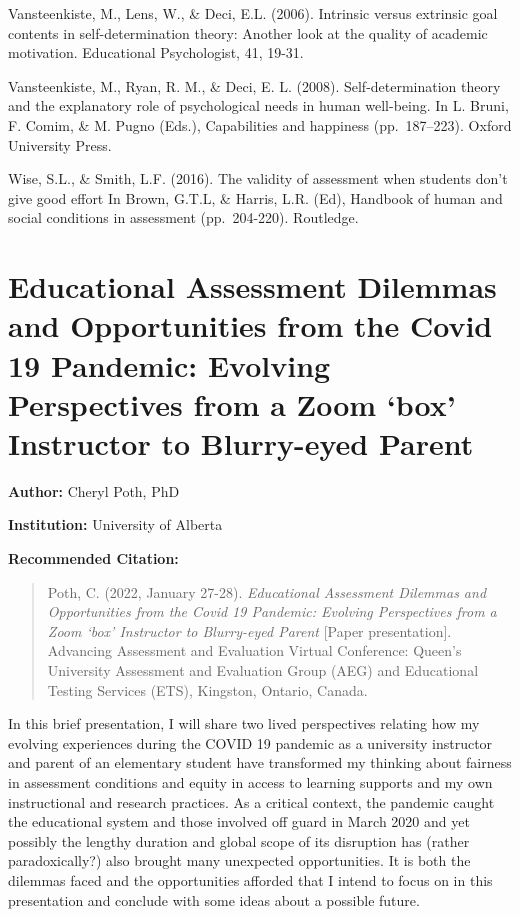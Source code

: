 \documentclass[
]{book}
\begin{document}
Vansteenkiste, M., Lens, W., \& Deci, E.L. (2006). Intrinsic versus extrinsic goal contents in self-determination theory: Another look at the quality of academic motivation. Educational Psychologist, 41, 19-31.

Vansteenkiste, M., Ryan, R. M., \& Deci, E. L. (2008). Self-determination theory and the explanatory role of psychological needs in human well-being. In L. Bruni, F. Comim, \& M. Pugno (Eds.), Capabilities and happiness (pp.~187--223). Oxford University Press.

Wise, S.L., \& Smith, L.F. (2016). The validity of assessment when students don't give good effort In Brown, G.T.L, \& Harris, L.R. (Ed), Handbook of human and social conditions in assessment (pp.~204-220). Routledge.

\newpage
\pagestyle{fancy}

\hypertarget{educational-assessment-dilemmas-and-opportunities-from-the-covid-19-pandemic-evolving-perspectives-from-a-zoom-box-instructor-to-blurry-eyed-parent}{%
\section{Educational Assessment Dilemmas and Opportunities from the Covid 19 Pandemic: Evolving Perspectives from a Zoom `box' Instructor to Blurry-eyed Parent}\label{educational-assessment-dilemmas-and-opportunities-from-the-covid-19-pandemic-evolving-perspectives-from-a-zoom-box-instructor-to-blurry-eyed-parent}}

\fancyhead[LE,RO]{\nouppercase{\truncate{0.5\headwidth}{\rightmark}}}
\fancyhead[LO,RE]{\nouppercase{\truncate{0.5\headwidth}{\leftmark}}}

\textbf{Author:} Cheryl Poth, PhD

\textbf{Institution:} University of Alberta

\textbf{Recommended Citation:}

\begin{quote}
Poth, C. (2022, January 27-28). \emph{Educational Assessment Dilemmas and Opportunities from the Covid 19 Pandemic: Evolving Perspectives from a Zoom `box' Instructor to Blurry-eyed Parent} {[}Paper presentation{]}. Advancing Assessment and Evaluation Virtual Conference: Queen's University Assessment and Evaluation Group (AEG) and Educational Testing Services (ETS), Kingston, Ontario, Canada.
\end{quote}

In this brief presentation, I will share two lived perspectives relating how my evolving experiences during the COVID 19 pandemic as a university instructor and parent of an elementary student have transformed my thinking about fairness in assessment conditions and equity in access to learning supports and my own instructional and research practices. As a critical context, the pandemic caught the educational system and those involved off guard in March 2020 and yet possibly the lengthy duration and global scope of its disruption has (rather paradoxically?) also brought many unexpected opportunities. It is both the dilemmas faced and the opportunities afforded that I intend to focus on in this presentation and conclude with some ideas about a possible future.
\end{document}
